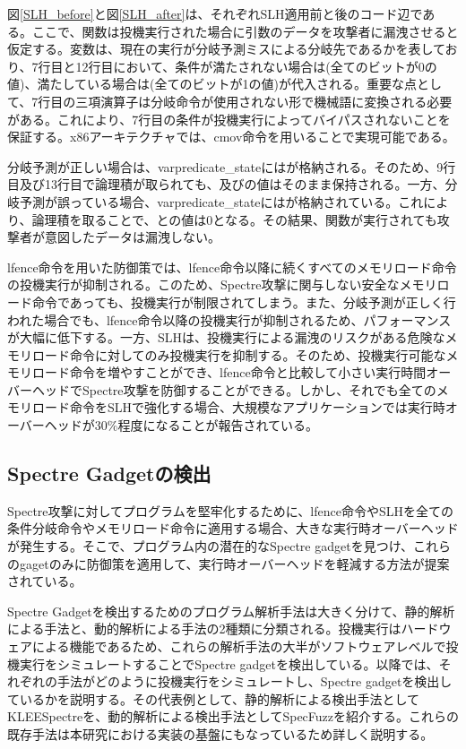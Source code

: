 図\ref{SLH_before}と図\ref{SLH_after}は、それぞれSLH適用前と後のコード辺である。ここで、関数は投機実行された場合に引数のデータを攻撃者に漏洩させると仮定する。変数は、現在の実行が分岐予測ミスによる分岐先であるかを表しており、7行目と12行目において、条件が満たされない場合は(全てのビットが0の値)、満たしている場合は(全てのビットが1の値)が代入される。重要な点として、7行目の三項演算子は分岐命令が使用されない形で機械語に変換される必要がある。これにより、7行目の条件が投機実行によってバイパスされないことを保証する。x86アーキテクチャでは、cmov命令を用いることで実現可能である\cite{LLVM-SLH}。\par
分岐予測が正しい場合は、var{predicate\_state}にはが格納される。そのため、9行目及び13行目で論理積が取られても、及びの値はそのまま保持される。一方、分岐予測が誤っている場合、var{predicate\_state}にはが格納されている。これにより、論理積を取ることで、との値は0となる。その結果、関数が実行されても攻撃者が意図したデータは漏洩しない。\par

lfence命令を用いた防御策では、lfence命令以降に続くすべてのメモリロード命令の投機実行が抑制される。このため、Spectre攻撃に関与しない安全なメモリロード命令であっても、投機実行が制限されてしまう。また、分岐予測が正しく行われた場合でも、lfence命令以降の投機実行が抑制されるため、パフォーマンスが大幅に低下する。一方、SLHは、投機実行による漏洩のリスクがある危険なメモリロード命令に対してのみ投機実行を抑制する。そのため、投機実行可能なメモリロード命令を増やすことができ、lfence命令と比較して小さい実行時間オーバーヘッドでSpectre攻撃を防御することができる。しかし、それでも全てのメモリロード命令をSLHで強化する場合、大規模なアプリケーションでは実行時オーバーヘッドが30\%程度になることが報告されている\cite{LLVM-SLH}。

\subsection{Spectre Gadgetの検出}
Spectre攻撃に対してプログラムを堅牢化するために、lfence命令やSLHを全ての条件分岐命令やメモリロード命令に適用する場合、大きな実行時オーバーヘッドが発生する。そこで、プログラム内の潜在的なSpectre gadgetを見つけ、これらのgagetのみに防御策を適用して、実行時オーバーヘッドを軽減する方法が提案されている。\par

Spectre Gadgetを検出するためのプログラム解析手法は大きく分けて、静的解析\cite{Spectre-Scanner,wang2018oo7,guarnieri2020spectector,wang2020kleespectre}による手法と、動的解析\cite{oleksenko2020specfuzz,qi2021spectaint,johannesmeyer2022kasper}による手法の2種類に分類される。投機実行はハードウェアによる機能であるため、これらの解析手法の大半がソフトウェアレベルで投機実行をシミュレートすることでSpectre gadgetを検出している。以降では、それぞれの手法がどのように投機実行をシミュレートし、Spectre gadgetを検出しているかを説明する。その代表例として、静的解析による検出手法としてKLEESpectre\cite{wang2020kleespectre}を、動的解析による検出手法としてSpecFuzz\cite{oleksenko2020specfuzz}を紹介する。これらの既存手法は本研究における実装の基盤にもなっているため詳しく説明する。

